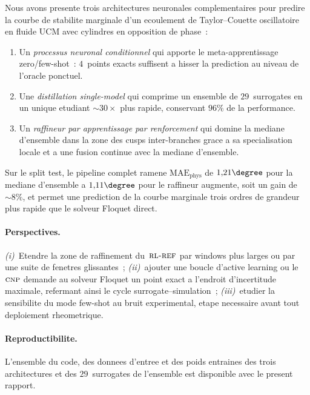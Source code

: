 \documentclass[11pt,a4paper]{article}
\newcommand{\CNP}{\textsc{cnp}}              %
\newcommand{\RLR}{\textsc{rl-ref}}           %
\begin{document}
Nous avons presente trois architectures neuronales complementaires
pour predire la courbe de stabilite marginale d'un ecoulement de
Taylor--Couette oscillatoire en fluide UCM avec cylindres en
opposition de phase~:
\begin{enumerate}[leftmargin=*,itemsep=2pt,topsep=4pt]
\item Un \emph{processus neuronal conditionnel} qui apporte le
   meta-apprentissage zero/few-shot~: $4$~points exacts suffisent
   a hisser la prediction au niveau de l'oracle ponctuel.
\item Une \emph{distillation single-model} qui comprime un ensemble
   de $29$~surrogates en un unique etudiant $\sim\!30\times$ plus
   rapide, conservant $96\%$ de la performance.
\item Un \emph{raffineur par apprentissage par renforcement} qui
   domine la mediane d'ensemble dans la zone des cusps
   inter-branches grace a sa specialisation locale et a une fusion
   continue avec la mediane d'ensemble.
\end{enumerate}
Sur le split test, le pipeline complet ramene
$\mathrm{MAE}_\text{phys}$ de $1{,}21\degree$ pour la mediane
d'ensemble a $1{,}11\degree$ pour le raffineur augmente, soit un
gain de $\sim\!8\%$, et permet une prediction de la courbe
marginale trois ordres de grandeur plus rapide que le solveur
Floquet direct.

\paragraph{Perspectives.}
\emph{(i)}~Etendre la zone de raffinement du~$\RLR$ par windows
plus larges ou par une suite de fenetres glissantes~;
\emph{(ii)}~ajouter une boucle d'active learning ou le~$\CNP$
demande au solveur Floquet un point exact a l'endroit
d'incertitude maximale, refermant ainsi le cycle
surrogate--simulation~;
\emph{(iii)}~etudier la sensibilite du mode few-shot au bruit
experimental, etape necessaire avant tout deploiement
rheometrique.

\paragraph{Reproductibilite.} L'ensemble du code, des donnees
d'entree et des poids entraines des trois architectures et des
$29$~surrogates de l'ensemble est disponible avec le present
rapport.
\end{document}
